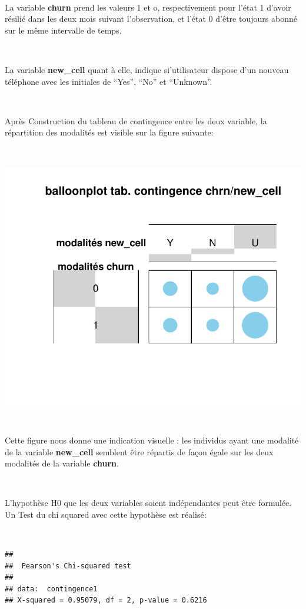\documentclass[]{imsart}
\numberwithin{equation}{section}
\theoremstyle{plain}
\begin{document}
~

La variable \textbf{churn} prend les valeurs 1 et o, respectivement pour l'état 1 d'avoir résilié dans les deux mois suivant l'observation, et l'état 0 d'être toujours abonné sur le même intervalle de temps.

~

La variable \textbf{new\_cell} quant à elle, indique si'utilisateur dispose d'un nouveau téléphone avec les initiales de ``Yes'', ``No'' et ``Unknown''.

~

Après Construction du tableau de contingence entre les deux variable, la répartition des modalités est visible sur la figure suivante:

~

\begin{flushleft}\includegraphics{Analyse_Exploratoire_Projet_files/figure-latex/unnamed-chunk-23-1} \end{flushleft}

~

Cette figure nous donne une indication visuelle : les individus ayant une modalité de la variable \textbf{new\_cell} semblent être répartis de façon égale sur les deux modalités de la variable \textbf{churn}.

~

L'hypothèse H0 que les deux variables soient indépendantes peut être formulée. Un Test du chi squared avec cette hypothèse est réalisé:

~

\begin{verbatim}
## 
##  Pearson's Chi-squared test
## 
## data:  contingence1
## X-squared = 0.95079, df = 2, p-value = 0.6216
\end{verbatim}
\end{document}
